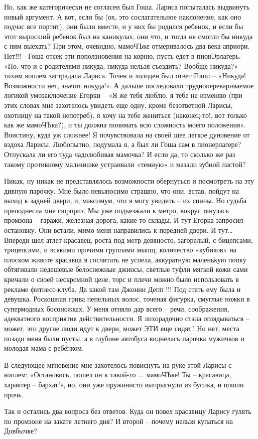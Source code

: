 Но, как же категорически не согласен был Гоша. Лариса попыталась выдвинуть
новый аргумент. А вот, если бы (ох, это сослагательное наклонение, как оно
подчас все портит), они были вместе, и у них бы родился ребенок, и если бы этот
выросший ребенок был на каникулах, они что, и тогда не смогли бы никуда с ним
выехать? При этом, очевидно, мамоЧЪке отмеривалось два века априори. Нет!!! -
Гоша отсек эти поползновения на корню, пусть едет в пионЭрлагерь. «Но, что и с
родителями никуда, никуда нельзя съездить? Вообще никуда?» – тихим воплем
застрадала Лариса. Точен и холоден был ответ Гоши – «Никуда! Возможности нет,
значит никуда!». А дальше последовало трудноперевариваемое логикой
умозаключение Егорки – «Я же тебя люблю, я тебе не изменяю (при этих словах мне
захотелось увидеть еще одну, кроме безответной Ларисы, охотницу на такой
непотреб), я хочу на тебе жениться (наконец-то!, вот только как же мамоЧЪка?),
и ты должна понимать всю сложность моего положения». Воистину, куда уж сложнее!
Я почувствовала на своей шее легкое дуновение от вздоха Ларисы. Любопытно,
подумала я, а был ли Гоша сам в пионерлагере? Отпускала ли его туда чадолюбивая
мамочка? И если да, то сколько же раз такому противному мальчишке устраивали
«темную» и мазали зубной пастой?

Никак, ну никак не представлялось возможности обернуться и посмотреть на эту
дивную парочку. Мне было невыносимо страшно, что они, встав, пойдут на выход к
задней двери, и, максимум, что я могу увидеть – их спины. Но судьба преподнесла
мне сюрприз. Мы уже подъезжали к метро, вокруг тянулась промзона – гаражи,
железная дорога, какие-то склады. И тут Егорка запросил остановку. Они встали,
мимо меня направились к передней двери. И тут… Впереди шел атлет-красавец,
роста под метр девяносто, загорелый, с бицепсами, трицепсами, и всякими прочими
группами мышц, количество «кубиков» на плоском животе красавца я сосчитать не
успела, аккуратную маленькую попку обтягивали недешевые белоснежные джинсы,
светлые туфли мягкой кожи сами кричали о своей нескромной цене, торс и плечи
можно было использовать в рекламе фитнесс-клуба. Да какой там Джонни Депп !!!
Под стать ему была и девушка. Роскошная грива пепельных волос, точеная фигурка,
смуглые ножки в супермодных босоножках. У меня отняло дар всего – речи,
соображения, адекватного восприятия действительности. Я лихорадочно стала
оглядываться – может, это другие люди идут к двери, может ЭТИ еще сидят? Но
нет, места позади меня были пусты, а в глубине автобуса виднелась парочка
мужичков и молодая мама с ребёнком.

В следующее мгновение мне захотелось повиснуть на руке этой Ларисы с воплем:
«Остановись, пошел он к такой-то ... мамоЧЪке! Ты – красавица, характер –
бархат!», но, они уже пружинисто выпрыгнули из бусика, и пошли прочь.

Так и остались два вопроса без ответов. Куда он повел красавицу Ларису гулять
по промзоне на закате летнего дня? И второй – почему нельзя купаться на
Довбычке?
